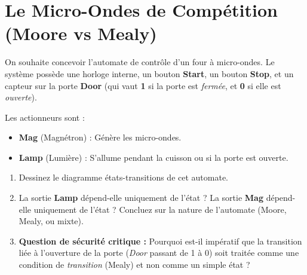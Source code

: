 \documentclass[a4paper,11pt]{article}
\begin{document}
\section{Le Micro-Ondes de Compétition (Moore vs Mealy)}
On souhaite concevoir l'automate de contrôle d'un four à micro-ondes.
Le système possède une horloge interne, un bouton \textbf{Start}, un bouton \textbf{Stop}, et un capteur sur la porte \textbf{Door} (qui vaut \textbf{1} si la porte est \textit{fermée}, et \textbf{0} si elle est \textit{ouverte}).

Les actionneurs sont :
\begin{itemize}
\item \textbf{Mag} (Magnétron) : Génère les micro-ondes.
\item \textbf{Lamp} (Lumière) : S'allume pendant la cuisson ou si la porte est ouverte.
\end{itemize}

\begin{enumerate}
\item Dessinez le diagramme états-transitions de cet automate.
\item La sortie \textbf{Lamp} dépend-elle uniquement de l'état ? La sortie \textbf{Mag} dépend-elle uniquement de l'état ? Concluez sur la nature de l'automate (Moore, Mealy, ou mixte).
\item \textbf{Question de sécurité critique :} Pourquoi est-il impératif que la transition liée à l'ouverture de la porte (\textit{Door} passant de 1 à 0) soit traitée comme une condition de \textit{transition} (Mealy) et non comme un simple état ?
\end{enumerate}
\end{document}
